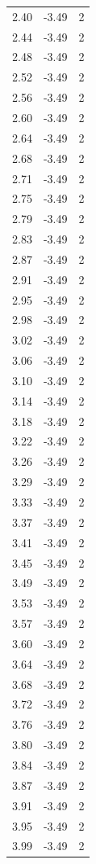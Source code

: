 \begin{longtable}{lrr}
  2.40 & -3.49 & 2 \\
  2.44 & -3.49 & 2 \\
  2.48 & -3.49 & 2 \\
  2.52 & -3.49 & 2 \\
  2.56 & -3.49 & 2 \\
  2.60 & -3.49 & 2 \\
  2.64 & -3.49 & 2 \\
  2.68 & -3.49 & 2 \\
  2.71 & -3.49 & 2 \\
  2.75 & -3.49 & 2 \\
  2.79 & -3.49 & 2 \\
  2.83 & -3.49 & 2 \\
  2.87 & -3.49 & 2 \\
  2.91 & -3.49 & 2 \\
  2.95 & -3.49 & 2 \\
  2.98 & -3.49 & 2 \\
  3.02 & -3.49 & 2 \\
  3.06 & -3.49 & 2 \\
  3.10 & -3.49 & 2 \\
  3.14 & -3.49 & 2 \\
  3.18 & -3.49 & 2 \\
  3.22 & -3.49 & 2 \\
  3.26 & -3.49 & 2 \\
  3.29 & -3.49 & 2 \\
  3.33 & -3.49 & 2 \\
  3.37 & -3.49 & 2 \\
  3.41 & -3.49 & 2 \\
  3.45 & -3.49 & 2 \\
  3.49 & -3.49 & 2 \\
  3.53 & -3.49 & 2 \\
  3.57 & -3.49 & 2 \\
  3.60 & -3.49 & 2 \\
  3.64 & -3.49 & 2 \\
  3.68 & -3.49 & 2 \\
  3.72 & -3.49 & 2 \\
  3.76 & -3.49 & 2 \\
  3.80 & -3.49 & 2 \\
  3.84 & -3.49 & 2 \\
  3.87 & -3.49 & 2 \\
  3.91 & -3.49 & 2 \\
  3.95 & -3.49 & 2 \\
  3.99 & -3.49 & 2 \\

\end{longtable}
